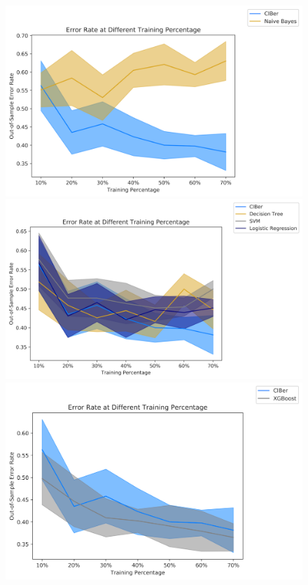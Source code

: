 \documentclass[twoside,11pt]{article}
\begin{document}
\begin{figure}[ht] 
  \begin{minipage}[b]{0.5\linewidth}
    \centering
    \includegraphics[width=0.85\linewidth]{Figures/Empirical/err_change_glass_1.png}
  \end{minipage}
  \begin{minipage}[b]{0.5\linewidth}
    \centering
    \includegraphics[width=0.9\linewidth]{Figures/Empirical/err_change_glass_2.png}
  \end{minipage} 
  \begin{minipage}[b]{0.5\linewidth}
    \centering
    \includegraphics[width=0.85\linewidth]{Figures/Empirical/err_change_glass_xgb.png}

\end{minipage}
\end{figure}
\end{document}
